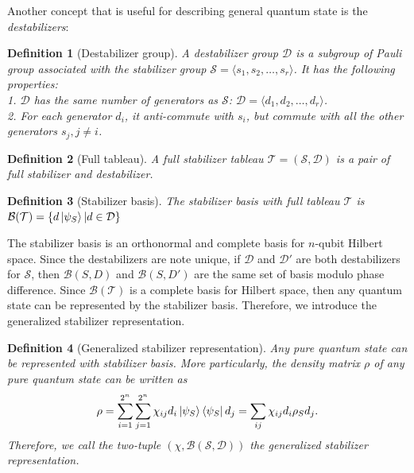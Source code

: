 \documentclass[a4paper,accepted=2024-07-10]{quantumarticle}
\newtheorem{definition}{Definition}[section]
\newcommand{\scB}{\mathcal{B}}
\newcommand{\scD}{\mathcal{D}}
\newcommand{\scT}{\mathcal{T}}
\newcommand{\scS}{\mathcal{S}}
\begin{document}
Another concept that is useful for describing general quantum state is the \emph{destabilizers}:
\begin{definition}[Destabilizer group]
    A \emph{destabilizer group} $\mathcal{D}$ is a subgroup of Pauli group associated with the stabilizer group $\mathcal{S}=\langle s_1,s_2,\dots,s_r\rangle$. It has the following properties:\\
        1. $\mathcal{D}$ has the same number of generators as $\mathcal{S}$: $\mathcal{D}=\langle d_1,d_2,\dots,d_r\rangle$. \\
        2. For each generator $d_i$, it anti-commute with $s_i$, but commute with all the other generators $s_j,j\neq i$.
\end{definition}


\begin{definition}[Full tableau]
A full stabilizer tableau $\mathcal{T}=(\mathcal{S},\mathcal{D})$ is a pair of full stabilizer and destabilizer.
\end{definition}
\begin{definition}[Stabilizer basis]
    The stabilizer basis with full tableau $\mathcal{T}$ is $\mathcal{B}(\scT)=\{d\ket{\psi_S}|d\in\scD\}$
\end{definition}

The stabilizer basis is an orthonormal and complete basis for $n$-qubit Hilbert space. Since the destabilizers are note unique, if $\scD$ and $\scD'$ are both destabilizers for $\scS$, then $\scB(S,D)$ and $\scB(S,D')$ are the same set of basis modulo phase difference. Since $\scB(\scT)$ is a complete basis for Hilbert space, then any quantum state can be represented by the stabilizer basis. Therefore, we introduce the generalized stabilizer representation.

\begin{definition}[Generalized stabilizer representation]
    Any pure quantum state can be represented with stabilizer basis. More particularly, the density matrix $\rho$ of any pure quantum state can be written as 
    \begin{equation}
        \rho = \sum_{i=1}^{2^n}\sum_{j=1}^{2^n}\chi_{ij}d_i\ket{\psi_{S}}\bra{\psi_{S}}d_j = \sum_{ij}\chi_{ij}d_i \rho_{S}d_j.
    \end{equation}
    Therefore, we call the two-tuple $(\chi,\scB(\scS,\scD))$ the generalized stabilizer representation.
\end{definition}
\end{document}
